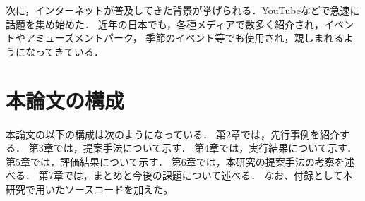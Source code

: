 次に，インターネットが普及してきた背景が挙げられる．YouTubeなどで急速に話題を集め始めた．
近年の日本でも，各種メディアで数多く紹介され，イベントやアミューズメントパーク，
季節のイベント等でも使用され，親しまれるようになってきている\cite{tppm}．


\section{本論文の構成}
本論文の以下の構成は次のようになっている．
第2章では，先行事例を紹介する．
第3章では，提案手法について示す．
第4章では，実行結果について示す．
第5章では，評価結果について示す．
第6章では，本研究の提案手法の考察を述べる．
第7章では，まとめと今後の課題について述べる．
なお、付録として本研究で用いたソースコードを加えた。
